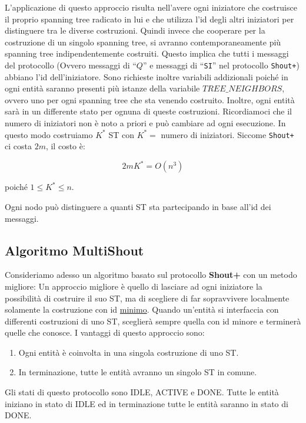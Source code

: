 L'applicazione di questo approccio risulta nell'avere ogni iniziatore che
costruisce il proprio spanning tree radicato in lui e che utilizza l'id degli
altri iniziatori per distinguere tra le diverse costruzioni. Quindi invece che
cooperare per la costruzione di un singolo spanning tree, si avranno
contemporaneamente più spanning tree indipendentemente costruiti. Questo implica
che  tutti i messaggi del protocollo (Ovvero messaggi di ``$Q$'' e messaggi di
``\texttt{SI}'' nel protocollo \texttt{Shout+}) abbiano l'id dell'iniziatore. Sono
richieste inoltre variabili addizionali poiché in ogni entità saranno presenti
più istanze della variabile $TREE\_NEIGHBORS$, ovvero uno per ogni spanning tree
che sta venendo costruito. Inoltre, ogni entità sarà in un differente stato per
ognuna di queste costruzioni. Ricordiamoci che il numero di iniziatori non è
noto a priori e può cambiare ad ogni esecuzione. In questo modo costruiamo $K^*$
ST con $K^*=$ numero di iniziatori. Siccome \texttt{Shout+} ci costa $2m$, il
costo è:

$$2m K^* = O(n^3)$$

poiché $1 \leq K^* \leq n$. %

Ogni nodo può distinguere a quanti ST sta partecipando in base all'id dei
messaggi.

\subsection{Algoritmo MultiShout}
Consideriamo adesso un algoritmo basato sul protocollo \textbf{Shout+} con un
metodo migliore: Un approccio migliore è quello di lasciare ad ogni iniziatore
la possibilità di costruire il suo ST, ma di scegliere di far sopravvivere
localmente solamente la costruzione con id \underline{minimo}. Quando un'entità
si interfaccia con differenti costruzioni di uno ST, sceglierà sempre quella con
id minore e terminerà quelle che conosce. I vantaggi di questo approccio sono:

\begin{enumerate}
    \item Ogni entità è coinvolta in una singola costruzione di uno ST.
    \item In terminazione, tutte le entità avranno un singolo ST in comune.
\end{enumerate}

Gli stati di questo protocollo sono IDLE, ACTIVE e DONE. Tutte le entità
iniziano in stato di IDLE ed in terminazione tutte le entità saranno in stato di
DONE.

